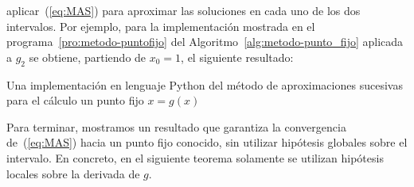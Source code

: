 \begin{example}
  aplicar~(\ref{eq:MAS}) para aproximar las soluciones en cada uno de
  los dos intervalos. Por ejemplo, para la implementación mostrada en
  el programa~\ref{pro:metodo-puntofijo} del
  Algoritmo~\ref{alg:metodo-punto_fijo} aplicada a $g_2$ se obtiene,
  partiendo de $x_0=1$, el siguiente resultado:
  \begin{pythonoutput}
  \end{pythonoutput}    
  \label{ex:punto-fijo-1}
  \begin{program}
    \label{pro:metodo-puntofijo}
    \caption{Una implementación en lenguaje Python del método de
      aproximaciones sucesivas para el cálculo un punto fijo $x=g(x)$}
  \end{program}
\end{example}

Para terminar, mostramos un resultado que garantiza la convergencia
de~(\ref{eq:MAS}) hacia un punto fijo conocido, sin utilizar hipótesis
globales sobre el intervalo. En concreto, en el siguiente teorema
solamente se utilizan hipótesis locales sobre la derivada de $g$.

